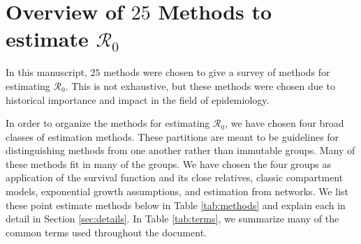 \documentclass[12pt]{article}
\newcommand{\XX}{\ensuremath{25}} %
\newcommand{\rr}{\ensuremath{\mathcal{R}_0}}
\begin{document}
\section{Overview of $\XX$ Methods to estimate $\rr$}
\label{sec:overview}

In this manuscript, $\XX$ methods were chosen to give a survey of methods for estimating $\rr$.  This is not exhaustive, but these methods were chosen due to historical importance and impact in the field of epidemiology. 

In order to organize the methods for estimating $\rr$, we have chosen four broad classes of estimation methods.  These partitions are meant to be guidelines for distinguishing methods from one another rather than immutable groups.  Many of these methods  fit in many of the groups.  We have chosen the four groups as application of the survival function and its close relatives, classic compartment models, exponential growth assumptions, and estimation from networks.  We list these point estimate methods below in Table \ref{tab:methods} and explain each in detail in Section \ref{sec:details}.  In Table \ref{tab:terms}, we summarize many of the common terms used throughout the document.
\end{document}
